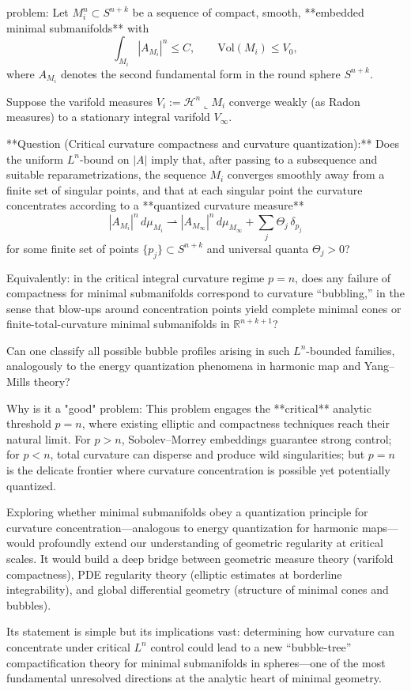 problem:  
Let \( M_i^n \subset S^{n+k} \) be a sequence of compact, smooth, **embedded minimal submanifolds** with  
\[
\int_{M_i} |A_{M_i}|^n \le C, \qquad \mathrm{Vol}(M_i)\le V_0,
\]
where \(A_{M_i}\) denotes the second fundamental form in the round sphere \(S^{n+k}\).  

Suppose the varifold measures \(V_i := \mathcal{H}^n\!\llcorner M_i\) converge weakly (as Radon measures) to a stationary integral varifold \(V_\infty\).  

**Question (Critical curvature compactness and curvature quantization):**  
Does the uniform \(L^n\)-bound on \(|A|\) imply that, after passing to a subsequence and suitable reparametrizations, the sequence \(M_i\) converges smoothly away from a finite set of singular points, and that at each singular point the curvature concentrates according to a **quantized curvature measure**
\[
|A_{M_i}|^n \, d\mu_{M_i} \rightharpoonup |A_{M_\infty}|^n\, d\mu_{M_\infty} + \sum_{j} \Theta_j \, \delta_{p_j}
\]
for some finite set of points \(\{p_j\}\subset S^{n+k}\) and universal quanta \(\Theta_j>0\)?  

Equivalently: in the critical integral curvature regime \(p=n\), does any failure of compactness for minimal submanifolds correspond to curvature “bubbling,” in the sense that blow-ups around concentration points yield complete minimal cones or finite-total-curvature minimal submanifolds in \(\mathbb{R}^{n+k+1}\)?  

Can one classify all possible bubble profiles arising in such \(L^n\)-bounded families, analogously to the energy quantization phenomena in harmonic map and Yang–Mills theory?

Why is it a "good" problem:  
This problem engages the **critical** analytic threshold \(p=n\), where existing elliptic and compactness techniques reach their natural limit. For \(p>n\), Sobolev–Morrey embeddings guarantee strong control; for \(p<n\), total curvature can disperse and produce wild singularities; but \(p=n\) is the delicate frontier where curvature concentration is possible yet potentially quantized.  

Exploring whether minimal submanifolds obey a quantization principle for curvature concentration—analogous to energy quantization for harmonic maps—would profoundly extend our understanding of geometric regularity at critical scales. It would build a deep bridge between geometric measure theory (varifold compactness), PDE regularity theory (elliptic estimates at borderline integrability), and global differential geometry (structure of minimal cones and bubbles).  

Its statement is simple but its implications vast: determining how curvature can concentrate under critical \(L^n\) control could lead to a new “bubble-tree” compactification theory for minimal submanifolds in spheres—one of the most fundamental unresolved directions at the analytic heart of minimal geometry.